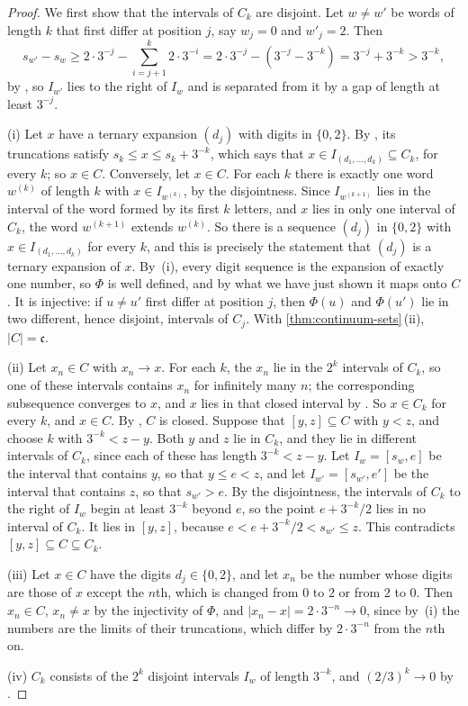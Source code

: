 \begin{proof}
We first show that the intervals of $C_k$ are disjoint. Let $w\ne w'$ be words of length $k$ that first differ at position $j$, say $w_j=0$ and $w'_j=2$. Then
\[
s_{w'}-s_w\ge2\cdot3^{-j}-\sum_{i=j+1}^k2\cdot3^{-i}=2\cdot3^{-j}-(3^{-j}-3^{-k})=3^{-j}+3^{-k}>3^{-k},
\]
by , so $I_{w'}$ lies to the right of $I_w$ and is separated from it by a gap of length at least $3^{-j}$.

(i) Let $x$ have a ternary expansion $(d_j)$ with digits in $\{0,2\}$. By , its truncations satisfy $s_k\le x\le s_k+3^{-k}$, which says that $x\in I_{(d_1,\ldots,d_k)}\subseteq C_k$, for every $k$; so $x\in C$. Conversely, let $x\in C$. For each $k$ there is exactly one word $w^{(k)}$ of length $k$ with $x\in I_{w^{(k)}}$, by the disjointness. Since $I_{w^{(k+1)}}$ lies in the interval of the word formed by its first $k$ letters, and $x$ lies in only one interval of $C_k$, the word $w^{(k+1)}$ extends $w^{(k)}$. So there is a sequence $(d_j)$ in $\{0,2\}$ with $x\in I_{(d_1,\ldots,d_k)}$ for every $k$, and this is precisely the statement that $(d_j)$ is a ternary expansion of $x$. By \,(i), every digit sequence is the expansion of exactly one number, so $\Phi$ is well defined, and by what we have just shown it maps onto $C$. It is injective: if $u\ne u'$ first differ at position $j$, then $\Phi(u)$ and $\Phi(u')$ lie in two different, hence disjoint, intervals of $C_j$. With \cref{thm:continuum-sets}\,(ii), $|C|=\mathfrak c$.

(ii) Let $x_n\in C$ with $x_n\to x$. For each $k$, the $x_n$ lie in the $2^k$ intervals of $C_k$, so one of these intervals contains $x_n$ for infinitely many $n$; the corresponding subsequence converges to $x$, and $x$ lies in that closed interval by . So $x\in C_k$ for every $k$, and $x\in C$. By , $C$ is closed. Suppose that $[y,z]\subseteq C$ with $y<z$, and choose $k$ with $3^{-k}<z-y$. Both $y$ and $z$ lie in $C_k$, and they lie in different intervals of $C_k$, since each of these has length $3^{-k}<z-y$. Let $I_w=[s_w,e]$ be the interval that contains $y$, so that $y\le e<z$, and let $I_{w'}=[s_{w'},e']$ be the interval that contains $z$, so that $s_{w'}>e$. By the disjointness, the intervals of $C_k$ to the right of $I_w$ begin at least $3^{-k}$ beyond $e$, so the point $e+3^{-k}/2$ lies in no interval of $C_k$. It lies in $[y,z]$, because $e<e+3^{-k}/2<s_{w'}\le z$. This contradicts $[y,z]\subseteq C\subseteq C_k$.

(iii) Let $x\in C$ have the digits $d_j\in\{0,2\}$, and let $x_n$ be the number whose digits are those of $x$ except the $n$th, which is changed from $0$ to $2$ or from $2$ to $0$. Then $x_n\in C$, $x_n\ne x$ by the injectivity of $\Phi$, and $|x_n-x|=2\cdot3^{-n}\to0$, since by \,(i) the numbers are the limits of their truncations, which differ by $2\cdot3^{-n}$ from the $n$th on.

(iv) $C_k$ consists of the $2^k$ disjoint intervals $I_w$ of length $3^{-k}$, and $(2/3)^k\to0$ by .
\end{proof}

